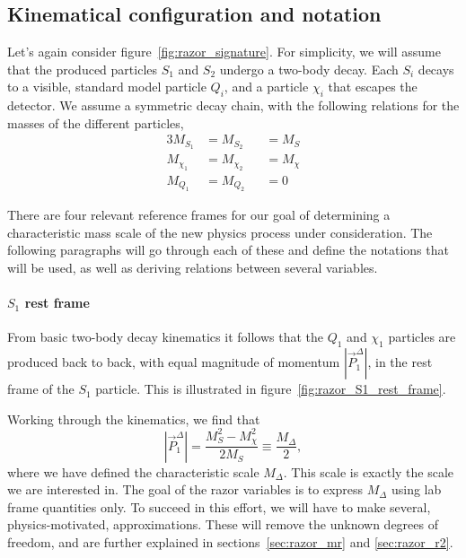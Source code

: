 
\subsection{Kinematical configuration and notation \label{sec:razor_notation}}

Let's again consider figure~\ref{fig:razor_signature}. For simplicity, we will assume that the
produced particles $S_1$ and $S_2$ undergo a two-body decay. Each $S_i$ decays to a visible,
standard model particle $Q_i$, and a particle $\chi_i$ that escapes the detector. 
We assume a symmetric decay chain, with the following relations for the masses of the different
particles,
\begin{alignat}{3}
  M_{S_1} &= M_{S_2} &&= M_S \label{eq:equal_S_masses}\\
  M_{\chi_1} &= M_{\chi_2} &&= M_{\chi} \\
  M_{Q_1} &= M_{Q_2} &&= 0
\end{alignat}

There are four relevant reference frames for our goal of determining a characteristic mass scale
of the new physics process under consideration. The following paragraphs will go through each of
these and define the notations that will be used, as well as deriving relations between several
variables. 

\paragraph{$S_1$ rest frame} 
From basic two-body decay kinematics it follows that the $Q_1$ and $\chi_1$ particles are produced
back to back, with equal magnitude of momentum $|\vec{P}^\Delta_1|$, in the rest frame of the $S_1$
particle. This is illustrated in figure~\ref{fig:razor_S1_rest_frame}. 

Working through the kinematics, we find that
\begin{equation}
  |\vec{P}^\Delta_1| = \frac{M_S^2 - M_\chi^2}{2M_S} \equiv \frac{M_\Delta}{2} ,
\end{equation}
where we have defined the characteristic scale $M_\Delta$. This scale is exactly the scale we are
interested in. The goal of the razor variables is to express $M_\Delta$ using lab frame quantities
only. To succeed in this effort, we will have to make several, physics-motivated, approximations.
These will remove the unknown degrees of freedom, and are further explained in
sections~\ref{sec:razor_mr} and \ref{sec:razor_r2}. 

